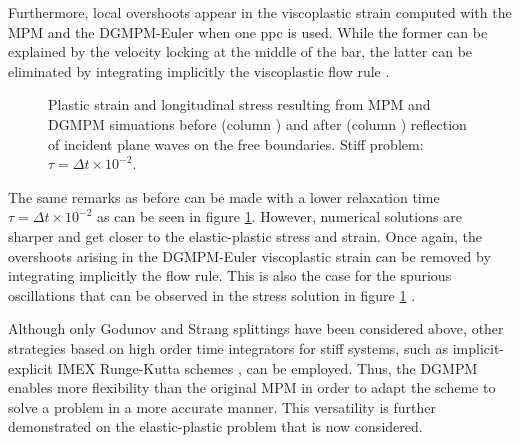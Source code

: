Furthermore, local overshoots appear in the viscoplastic strain computed with the MPM and the DGMPM-Euler when one ppc is used. While the former can be explained by the velocity locking at the middle of the bar, the latter can be eliminated by integrating implicitly the viscoplastic flow rule \cite{Thomas_EVP}.
\begin{figure}[h!]
  \centering
  { \label{subfig:evp_stiff1}}
  { \label{subfig:evp_stiff3}}
  {}
  \caption{Plastic strain and longitudinal stress resulting from MPM and DGMPM simuations before (column ) and after (column ) reflection of incident plane waves on the free boundaries. Stiff problem: $\tau=\Delta t \times 10^{-2}$.}
  \label{fig:siff_elastoviscoplastic_RP}
\end{figure}

The same remarks as before can be made with a lower relaxation time $\tau=\Delta t \times 10^{-2}$ as can be seen in figure \ref{fig:siff_elastoviscoplastic_RP}. However, numerical solutions are sharper and get closer to the elastic-plastic stress and strain.
Once again, the overshoots arising in the DGMPM-Euler viscoplastic strain can be removed by integrating implicitly the flow rule. This is also the case for the spurious oscillations that can be observed in the stress solution in figure \ref{fig:siff_elastoviscoplastic_RP} \cite{Thomas_EVP}. %

Although only Godunov and Strang splittings have been considered above, other strategies based on high order time integrators for stiff systems, such as implicit-explicit IMEX Runge-Kutta schemes \cite{Pareschi_stiff}, can be employed.
Thus, the DGMPM enables more flexibility than the original MPM in order to adapt the scheme to solve a problem in a more accurate manner.
This versatility is further demonstrated on the elastic-plastic problem that is now considered.

